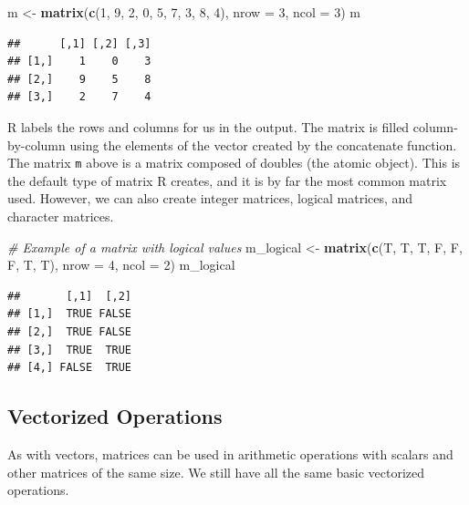 \documentclass[
]{book}
\newenvironment{Shaded}{\begin{snugshade}}{\end{snugshade}}
\newcommand{\CommentTok}[1]{\textcolor[rgb]{0.56,0.35,0.01}{\textit{#1}}}
\newcommand{\DataTypeTok}[1]{\textcolor[rgb]{0.13,0.29,0.53}{#1}}
\newcommand{\DecValTok}[1]{\textcolor[rgb]{0.00,0.00,0.81}{#1}}
\newcommand{\KeywordTok}[1]{\textcolor[rgb]{0.13,0.29,0.53}{\textbf{#1}}}
\newcommand{\NormalTok}[1]{#1}
\newcommand{\StringTok}[1]{\textcolor[rgb]{0.31,0.60,0.02}{#1}}
\begin{document}
\begin{Shaded}
\begin{Highlighting}[]
\NormalTok{m <-}\StringTok{ }\KeywordTok{matrix}\NormalTok{(}\KeywordTok{c}\NormalTok{(}\DecValTok{1}\NormalTok{, }\DecValTok{9}\NormalTok{, }\DecValTok{2}\NormalTok{, }\DecValTok{0}\NormalTok{, }\DecValTok{5}\NormalTok{, }\DecValTok{7}\NormalTok{, }\DecValTok{3}\NormalTok{, }\DecValTok{8}\NormalTok{, }\DecValTok{4}\NormalTok{), }\DataTypeTok{nrow =} \DecValTok{3}\NormalTok{, }\DataTypeTok{ncol =} \DecValTok{3}\NormalTok{)}
\NormalTok{m}
\end{Highlighting}
\end{Shaded}

\begin{verbatim}
##      [,1] [,2] [,3]
## [1,]    1    0    3
## [2,]    9    5    8
## [3,]    2    7    4
\end{verbatim}

R labels the rows and columns for us in the output. The matrix is filled column-by-column using the elements of the vector created by the concatenate function. The matrix \texttt{m} above is a matrix composed of doubles (the atomic object). This is the default type of matrix R creates, and it is by far the most common matrix used. However, we can also create integer matrices, logical matrices, and character matrices.

\begin{Shaded}
\begin{Highlighting}[]
\CommentTok{# Example of a matrix with logical values}
\NormalTok{m_logical <-}\StringTok{ }\KeywordTok{matrix}\NormalTok{(}\KeywordTok{c}\NormalTok{(T, T, T, F, F, F, T, T), }\DataTypeTok{nrow =} \DecValTok{4}\NormalTok{, }\DataTypeTok{ncol =} \DecValTok{2}\NormalTok{)}
\NormalTok{m_logical}
\end{Highlighting}
\end{Shaded}

\begin{verbatim}
##       [,1]  [,2]
## [1,]  TRUE FALSE
## [2,]  TRUE FALSE
## [3,]  TRUE  TRUE
## [4,] FALSE  TRUE
\end{verbatim}

\hypertarget{vectorized-operations}{%
\subsection{Vectorized Operations}\label{vectorized-operations}}

As with vectors, matrices can be used in arithmetic operations with scalars and other matrices of the same size. We still have all the same basic vectorized operations.
\end{document}
